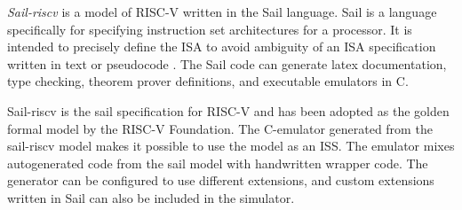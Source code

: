 \textit{Sail-riscv} \cite{RISCVSailModel2023} is a model of RISC-V written in the Sail language. Sail is a language specifically for specifying instruction set architectures for a processor. It is intended to precisely define the ISA to avoid ambiguity of an ISA specification written in text or pseudocode \cite{armstrongSailInstructionsetSemantics2023}. The Sail code can generate latex documentation, type checking, theorem prover definitions, and executable emulators in C.  

Sail-riscv is the sail specification for RISC-V and has been adopted as the golden formal model by the RISC-V Foundation. 
The C-emulator generated from the sail-riscv model makes it possible to use the model as an ISS. The emulator mixes autogenerated code from the sail model with handwritten wrapper code. The generator can be configured to use different extensions, and custom extensions written in Sail can also be included in the simulator. 





